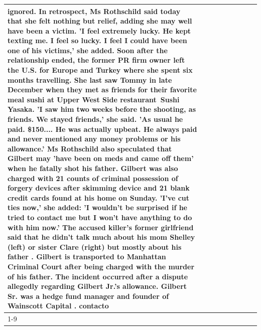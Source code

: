 \begin{table}[H]
\begin{tabular}{lllrlllll}
ignored. In retrospect, Ms Rothschild said today that she felt nothing but relief, adding she may well have been a victim. 'I feel extremely lucky. He kept texting me. I feel so lucky. I feel I could have been one of his victims,' she added. Soon after the relationship ended, the former PR firm owner left the U.S. for Europe and Turkey where she spent six months  travelling. She last saw Tommy in late December when they met as friends for their favorite meal sushi at Upper West Side restaurant Sushi Yasaka. 'I saw him two weeks before the shooting, as friends. We stayed friends,' she said. 'As usual he paid. \$150.... He was actually upbeat. He always paid and never mentioned any money problems or his allowance.' Ms Rothschild also speculated that Gilbert may 'have been on meds and came off them' when he fatally shot his father. Gilbert was also charged with 21 counts of criminal possession of forgery devices after skimming device and 21 blank credit cards found at his home on Sunday. 'I've cut ties now,' she added: 'I wouldn’t be surprised if he tried to contact me but I won’t have anything to do with him now.' The accused killer's former girlfriend said that he didn't talk much about his mom Shelley (left) or sister Clare (right) but mostly about his father . Gilbert is transported to Manhattan Criminal Court  after being charged with the murder of his father. The incident occurred after a dispute allegedly regarding Gilbert Jr.'s allowance. Gilbert Sr. was a hedge fund manager and founder of Wainscott Capital . contacto \\
\cline{1-9}

\end{tabular}
\end{table}
